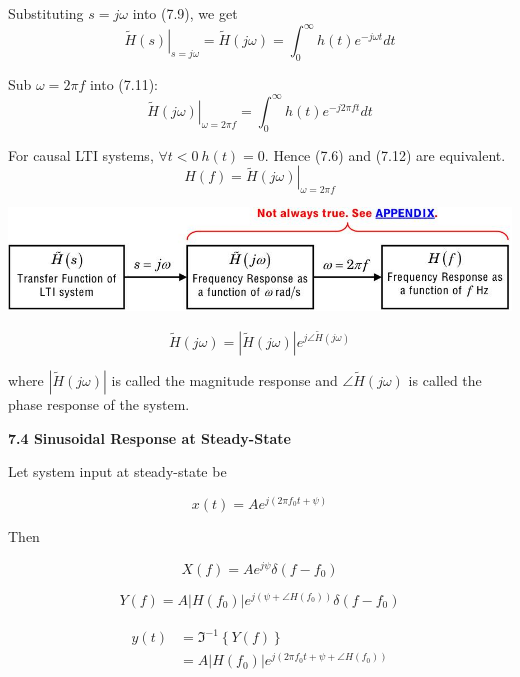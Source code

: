 \documentclass[landscape,a4paper]{extarticle}
\newenvironment{Figure}
  {\noindent\minipage{\linewidth}}
  {\endminipage\par\medskip}
\newcommand{\invfourier}[1]{\Im^{-1}\left\{#1\right\}}
\begin{document}
\begin{multicols*}{5}
    Substituting $s = j \omega$ into (7.9), we get 
    \[
        \left.\tilde{H}(s)\right|_{s=j\omega} = \tilde{H}(j \omega) = \int_{0}^{\infty}h(t)e^{-j \omega t} dt \tag{7.11}
    \]

    Sub $\omega = 2 \pi f$ into (7.11):
    \[
        \left.\tilde{H}(j\omega)\right|_{\omega = 2\pi f} = \int_{0}^{\infty} h(t) e^{-j2\pi f t}dt \tag{7.12}
    \]

    For causal LTI systems, $\forall t < 0\ h(t) = 0$. Hence (7.6) and (7.12) are equivalent.
    \[
        H(f) = \left.\tilde{H}(j \omega)\right|_{\omega=2\pi f} \tag{7.13}
    \]

    \begin{Figure}
        \centering
        \includegraphics[width=\linewidth]{transferFunc_freqResponse.jpg}        
    \end{Figure}

    \[
        \tilde{H}(j\omega) = |\tilde{H}(j\omega)|e^{j\angle \tilde{H}(j \omega)} \tag{7.14}
    \]

    where $|\tilde{H}(j \omega)|$ is called the magnitude response
    and $\angle \tilde{H}(j \omega)$ is called the phase response of the system.

    \textbf{7.4 Sinusoidal Response at Steady-State}

    Let system input at steady-state be 
    
    \[
        x(t) = Ae^{j (2\pi f_0t + \psi)} \tag{7.15}
    \]

    Then

    \[
        X(f) = Ae^{j\psi}\delta (f-f_0) \tag{7.16}
    \]

    \[
        Y(f) = A \left|H(f_0)\right|e^{j(\psi + \angle H(f_0))}\delta(f-f_0) \tag{7.17}
    \]

    \begin{align*}
        \begin{split}
            y(t) &= \invfourier{Y(f)}\\
            &= A \left|H(f_0)\right|e^{j(2\pi f_0 t + \psi + \angle H(f_0))} 
        \end{split} \tag{7.18}
    \end{align*}


\end{multicols*}
\end{document}
